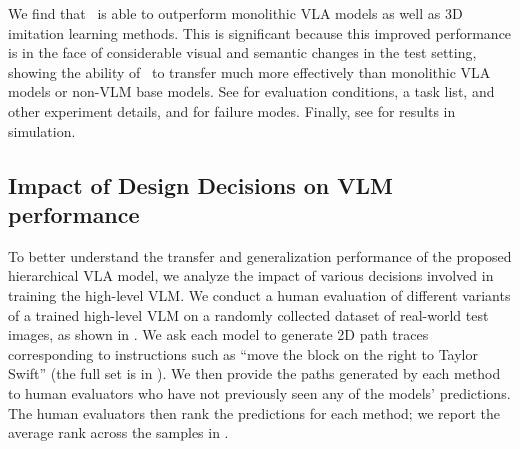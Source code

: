 We find that \method~is able to outperform monolithic VLA models as well as 3D imitation learning methods. This is significant because this improved performance is in the face of considerable visual and semantic changes in the test setting, showing the ability of \method~to transfer much more effectively than monolithic VLA models or non-VLM base models. See  for evaluation conditions, a task list, and other experiment details, and  for failure modes.
Finally, see  for results in simulation.

\subsection{Impact of Design Decisions on VLM performance}
\label{sec:experiments:vlm_design}
To better understand the transfer and generalization performance of the proposed hierarchical VLA model, we analyze the impact of various decisions involved in training the high-level VLM. We conduct a human evaluation of different variants of a trained high-level VLM on a randomly collected dataset of real-world test images, as shown in . We ask each model to generate 2D path traces corresponding to instructions such as ``move the block on the right to Taylor Swift'' 
(the full set is in ). We then provide the paths generated by each method to human evaluators who have not previously seen any of the models' predictions. The human evaluators then rank the predictions for each method; we report the average rank across the samples in . 

